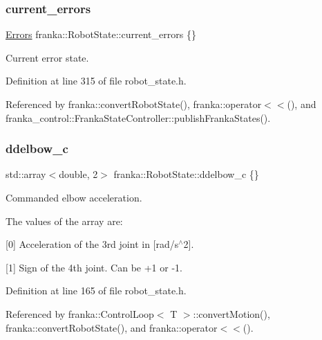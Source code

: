 \mbox{\label{structfranka_1_1RobotState_abc5515f7a27f5de82396ea792a5ecb48}} 
\subsubsection{\texorpdfstring{current\+\_\+errors}{current\_errors}}
{\footnotesize\ttfamily \hyperlink{structfranka_1_1Errors}{Errors} franka\+::\+Robot\+State\+::current\+\_\+errors \{\}}

Current error state. 

Definition at line 315 of file robot\+\_\+state.\+h.



Referenced by franka\+::convert\+Robot\+State(), franka\+::operator$<$$<$(), and franka\+\_\+control\+::\+Franka\+State\+Controller\+::publish\+Franka\+States().

\mbox{\label{structfranka_1_1RobotState_a1e5b6caf84249b1129491dbbcb1fc2e6}} 
\subsubsection{\texorpdfstring{ddelbow\+\_\+c}{ddelbow\_c}}
{\footnotesize\ttfamily std\+::array$<$double, 2$>$ franka\+::\+Robot\+State\+::ddelbow\+\_\+c \{\}}

Commanded elbow acceleration.

The values of the array are\+:
\begin{DoxyItemize}
\item \mbox{[}0\mbox{]} Acceleration of the 3rd joint in \mbox{[}rad/s$^\wedge$2\mbox{]}.
\item \mbox{[}1\mbox{]} Sign of the 4th joint. Can be +1 or -\/1. 
\end{DoxyItemize}

Definition at line 165 of file robot\+\_\+state.\+h.



Referenced by franka\+::\+Control\+Loop$<$ T $>$\+::convert\+Motion(), franka\+::convert\+Robot\+State(), and franka\+::operator$<$$<$().

